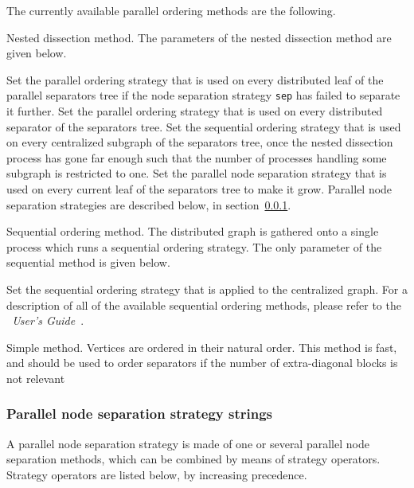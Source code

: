 The currently available parallel ordering methods are the following.
\begin{itemize}
\iteme[{\tt n}]
Nested dissection method. The parameters of the nested dissection
method are given below.
\begin{itemize}
\iteme[{\tt ole=}{\it strat}]
Set the parallel ordering strategy that is used on every distributed
leaf of the parallel separators tree if the node separation strategy
{\tt sep} has failed to separate it further.
\iteme[{\tt ose=}{\it strat}]
Set the parallel ordering strategy that is used on every distributed
separator of the separators tree.
\iteme[{\tt osq=}{\it strat}]
Set the sequential ordering strategy that is used on every centralized
subgraph of the separators tree, once the nested dissection process has
gone far enough such that the number of processes handling some
subgraph is restricted to one.
\iteme[{\tt sep=}{\it strat}]
Set the parallel node separation strategy that is used on every
current leaf of the separators tree to make it grow. Parallel
node separation strategies are described below, in
section~\ref{sec-lib-format-strat-pnsep}.
\end{itemize}
\iteme[{\tt q}]
Sequential ordering method. The distributed graph is gathered onto a
single process which runs a sequential ordering strategy. The only
parameter of the sequential method is given below.
\begin{itemize}
\iteme[{\tt strat=}{\it strat}]
Set the sequential ordering strategy that is applied to the
centralized graph. For a description of all of the available
sequential ordering methods, please refer to the
{\it\scotch\ User's Guide}~\scotchcitesuser.
\end{itemize}
\iteme[{\tt s}]
Simple method. Vertices are ordered in their natural order. This
method is fast, and should be used to order separators if the number
of extra-diagonal blocks is not relevant
\end{itemize}

\subsubsection{Parallel node separation strategy strings}
\label{sec-lib-format-strat-pnsep}

A parallel node separation strategy is made of one or several parallel
node separation methods, which can be combined by means of strategy
operators. Strategy operators are listed below, by increasing
precedence.

